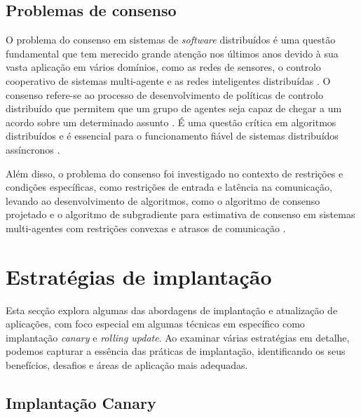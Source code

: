 \subsection{Problemas de consenso}

O problema do consenso em sistemas de \textit{software} distribuídos é uma questão fundamental que 
tem merecido grande atenção nos últimos anos devido à sua vasta aplicação em vários domínios, como
as redes de sensores, o controlo cooperativo de sistemas multi-agente e as redes inteligentes 
distribuídas \cite{consensus2020}. O consenso refere-se ao processo de desenvolvimento de políticas 
de controlo distribuído que permitem que um grupo de agentes seja capaz de chegar a um acordo sobre 
um determinado assunto \cite{consensus2013}. É uma questão crítica em algoritmos distribuídos e é
essencial para o funcionamento fiável de sistemas distribuídos assíncronos \cite{consesus2016} 
\cite{consensus2011}.

Além disso, o problema do consenso foi investigado no contexto de restrições e condições
específicas, como restrições de entrada e latência na comunicação, levando ao desenvolvimento de
algoritmos, como o algoritmo de consenso projetado e o algoritmo de subgradiente para estimativa 
de consenso em sistemas multi-agentes com restrições convexas e atrasos de comunicação 
\cite{consensus2018}.

\section{Estratégias de implantação}

Esta secção explora algumas das abordagens de implantação e atualização de aplicações, com foco 
especial em algumas técnicas em específico como implantação \textit{canary} e \textit{rolling update}.
Ao examinar várias estratégias em detalhe, podemos capturar a essência das práticas de implantação, 
identificando os seus benefícios, desafios e áreas de aplicação mais adequadas. 

\subsection{Implantação Canary}

